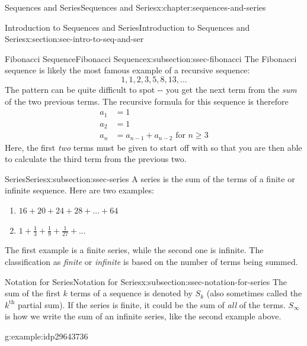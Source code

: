 \documentclass[twoside,10pt,]{book}
\numberwithin{equation}{section}
\newcommand{\kth}{{k^{\text{th}}}}
\newcommand{\infinity}{{\infty}}
\newcommand{\amp}{&}
\begin{document}
\begin{chapterptx}{Sequences and Series}{}{Sequences and Series}{}{}{x:chapter:sequences-and-series}
\begin{sectionptx}{Introduction to Sequences and Series}{}{Introduction to Sequences and Series}{}{}{x:section:sec-intro-to-seq-and-ser}
%
%
\typeout{************************************************}
\typeout{************************************************}
%
\begin{subsectionptx}{Fibonacci Sequence}{}{Fibonacci Sequence}{}{}{x:subsection:ssec-fibonacci}
The Fibonacci sequence is likely the most famous example of a recursive sequence: %
\begin{equation*}
1, 1, 2, 3, 5, 8, 13, \ldots
\end{equation*}
The pattern can be quite difficult to spot -{}-{} you get the next term from the \emph{sum} of the two previous terms.  The recursive formula for this sequence is therefore%
\begin{align*}
{a_1} \amp = 1\\
{a_2} \amp = 1\\
{a_n} \amp = {a_{n - 1}} + {a_{n - 2}} \text{ for } n \ge 3
\end{align*}
Here, the first \emph{two} terms must be given to start off with so that you are then able to calculate the third term from the previous two.%
\end{subsectionptx}
%
%
\typeout{************************************************}
\typeout{************************************************}
%
\begin{subsectionptx}{Series}{}{Series}{}{}{x:subsection:ssec-series}
A series is the sum of the terms of a finite or infinite sequence.  Here are two examples:%
\begin{enumerate}[label=(\alph*)]
\item{}\(\displaystyle 16 + 20 + 24 + 28 + \ldots + 64\)%
\item{}\(\displaystyle 1 + \frac{1}{3} + \frac{1}{9} + \frac{1}{{27}} + ...\)%
\end{enumerate}
The first example is a finite series, while the second one is infinite. The classification as \emph{finite} or \emph{infinite} is based on the number of terms being summed.%
\end{subsectionptx}
%
%
\typeout{************************************************}
\typeout{************************************************}
%
\begin{subsectionptx}{Notation for Series}{}{Notation for Series}{}{}{x:subsection:ssec-notation-for-series}
The sum of the first \(k\) terms of a sequence is denoted by \(S_k\) (also sometimes called the \(\kth{}\) partial sum).  If the series is finite, it could be the sum of \emph{all} of the terms.  \(S_\infinity\) is how we write the sum of an infinite series, like the second example above. \begin{example}{}{g:example:idp29643736}%

\end{example}
\end{subsectionptx}
\end{sectionptx}
\end{chapterptx}
\end{document}
